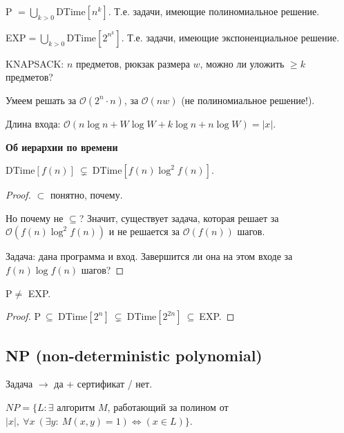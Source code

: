 \begin{definition}
    P $= \bigcup\limits_{k>0} $DTime$[n^k]$. Т.е. задачи, имеющие полиномиальное решение.
\end{definition}

\begin{definition}
    EXP$ = \bigcup\limits_{k>0} $DTime$[2^{n^k}]$. Т.е. задачи, имеющие экспоненциальное решение.
\end{definition}

\begin{example}
    KNAPSACK: $n$ предметов, рюкзак размера $w$, можно ли уложить $\geq k$ предметов?

    Умеем решать за $\mathcal{O}(2^n\cdot n)$, за $\mathcal{O}(nw)$ (не полиномиальное решение!).

    Длина входа: $\mathcal{O}(n\log n+W\log W+k\log n + n\log W)=|x|$.
\end{example}

\begin{theorem}
    \textbf{Об иерархии по времени}

    DTime$[f(n)]\ \subsetneq\ $DTime$[f(n)\log^2 f(n)]$.
\end{theorem}

\begin{proof}
    $\subset$ понятно, почему.

    Но почему не $\subseteq$? Значит, существует задача, которая решает за $\mathcal{O}(f(n)\log^2 f(n))$ и не решается за $\mathcal{O}(f(n))$ шагов.

    Задача: дана программа и вход. Завершится ли она на этом входе за $f(n)\log f(n)$ шагов?

\end{proof}

\begin{corollary}
    P$\neq$ EXP.
\end{corollary}

\begin{proof}
    P$\ \subseteq\ $DTime$[2^n]\ \subsetneq\ $DTime$[2^{2n}]\ \subseteq\ $EXP.
\end{proof}

\subsection{NP (non-deterministic polynomial)}
Задача $\rightarrow$ да + сертификат / нет.

\begin{definition}
    $NP = \{L: \exists $ алгоритм $ M$, работающий за полином от $|x|,\ \forall x\ (\exists y:\ M(x,y) = 1) \Leftrightarrow (x \in L )\}$.
\end{definition}

